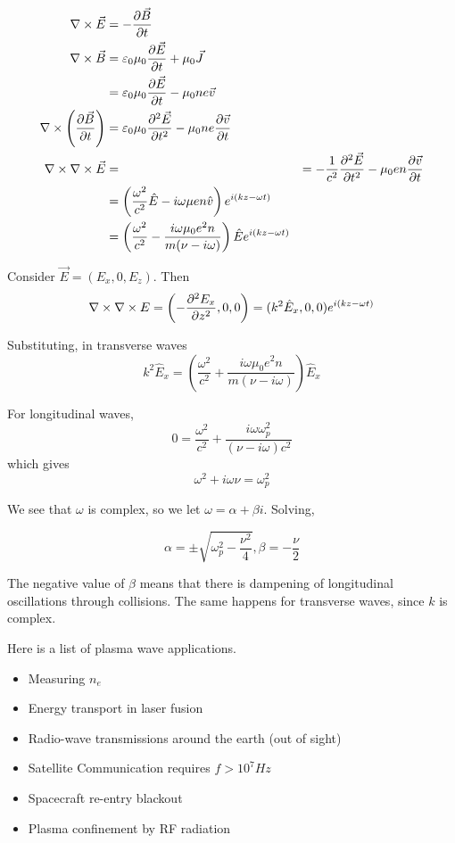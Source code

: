 \documentclass[12pt]{article}
\begin{document}
\begin{align*}
    \nabla \times \vec E &= -\frac{\partial \vec B}{\partial t} \\
    \nabla \times \vec B &= \varepsilon_0\mu_0 \frac{\partial \vec E}{\partial t} + \mu_0 \vec J \\
                         &= \varepsilon_0\mu_0 \frac{\partial \vec E}{\partial t} - \mu_0ne\vec v \\
    \nabla \times\left(\frac{\partial \vec B}{\partial t}\right) &= \varepsilon_0\mu_0 \frac{\partial ^2\vec E}{\partial t^2} - \mu_0ne\frac{\partial \vec v}{\partial t} \\
    \nabla \times \nabla \times \vec E &= &= - \frac{1}{c^2} \frac{\partial ^2\vec E}{\partial t^2} - \mu_0en\frac{\partial \vec v}{\partial t} \\
                                       &= \left(\frac{\omega^2}{c^2}\hat E - i\omega\mu en\hat v\right)e^{i(kz-\omega t)} \\
                                       &= \left(\frac{\omega^2}{c^2} - \frac{i\omega\mu_0e^2n}{m(\nu-i\omega)}\right)\hat E e^{i(kz-\omega t)}
\end{align*}

Consider $\vec E = (E_x, 0, E_z)$. Then
$$\nabla \times \nabla \times E = \left(-\frac{\partial ^2E_x}{\partial z^2},0,0\right) = (k^2\hat E_x,0,0)e^{i(kz-\omega t)}$$

Substituting, in transverse waves
$$k^2\hat E_x = \left(\frac{\omega^2}{c^2} + \frac{i\omega \mu_0e^2n}{m(\nu-i\omega)}\right)\hat E_x$$

For longitudinal waves,
$$0 = \frac{\omega^2}{c^2} + \frac{i\omega\omega_p^2}{(\nu-i\omega)c^2}$$
which gives
$$\omega^2 + i\omega\nu = \omega_p^2$$

We see that $\omega$ is complex, so we let $\omega = \alpha + \beta i$. Solving,

$$\alpha = \pm\sqrt{\omega_p^2 - \frac{\nu^2}{4}}, \beta = -\frac{\nu}{2}$$

The negative value of $\beta$ means that there is dampening of longitudinal oscillations through collisions. The same happens for transverse waves, since $k$ is complex.

Here is a list of plasma wave applications.

\begin{itemize}
    \item Measuring $n_e$
    \item Energy transport in laser fusion
    \item Radio-wave transmissions around the earth (out of sight)
    \item Satellite Communication requires $f > 10^7\unit{Hz}$
    \item Spacecraft re-entry blackout
    \item Plasma confinement by RF radiation
\end{itemize}
\end{document}
